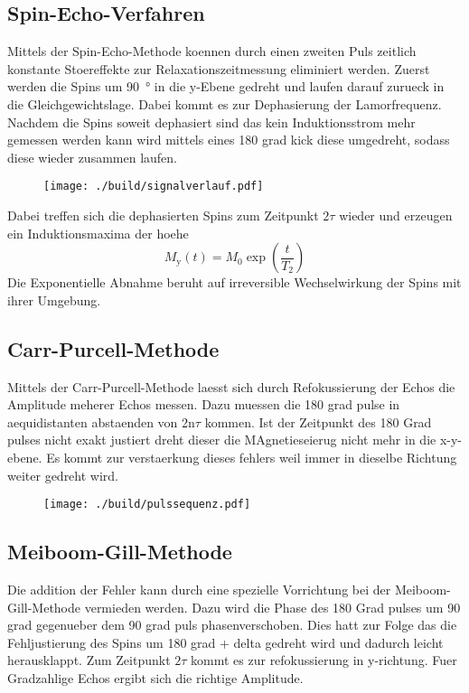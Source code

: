 \subsection{Spin-Echo-Verfahren}%
\label{sub:spin_echo_verfahren}
Mittels der Spin-Echo-Methode koennen durch einen zweiten Puls zeitlich
konstante Stoereffekte zur Relaxationszeitmessung eliminiert werden. 
Zuerst werden die Spins um \SI{90}{\degree} in die y-Ebene gedreht und laufen
darauf zurueck in die Gleichgewichtslage.
Dabei kommt es zur Dephasierung der Lamorfrequenz. 
Nachdem die Spins soweit dephasiert sind das kein Induktionsstrom mehr gemessen
werden kann wird mittels eines 180 grad kick diese umgedreht, sodass diese
wieder zusammen laufen.
\begin{figure}[h]
		\centering
		\texttt{[image: ./build/signalverlauf.pdf]}
		\caption{}
		\label{fig:sign}
\end{figure}
Dabei treffen sich die dephasierten Spins zum Zeitpunkt $2 \tau$ wieder und
erzeugen ein Induktionsmaxima der hoehe 
\begin{equation}
		\label{eq:}
		M_\text{y}(t) = M_0 \exp\left( \frac{t}{T_2} \right)
\end{equation}
Die Exponentielle Abnahme beruht auf irreversible Wechselwirkung der Spins mit
ihrer Umgebung. 

\subsection{Carr-Purcell-Methode}%
\label{sub:car_purcell}
Mittels der Carr-Purcell-Methode laesst sich durch Refokussierung der Echos die
Amplitude meherer Echos messen. 
Dazu muessen die 180 grad pulse in aequidistanten abstaenden von 2n$\tau$
kommen. 
Ist der Zeitpunkt des 180 Grad pulses nicht exakt justiert dreht dieser die
MAgnetieseierug nicht mehr in die x-y-ebene. 
Es kommt zur verstaerkung dieses fehlers weil immer in dieselbe Richtung weiter
gedreht wird.

\begin{figure}[ht]
		\centering
		\texttt{[image: ./build/pulssequenz.pdf]}
		\caption{}
		\label{fig:}
\end{figure}

\subsection{Meiboom-Gill-Methode}%
\label{sub:meiboom_gill_methode}
Die addition der Fehler kann durch eine spezielle Vorrichtung bei der
Meiboom-Gill-Methode vermieden werden.
Dazu wird die Phase des 180 Grad pulses um 90 grad gegenueber dem 90 grad puls phasenverschoben.
Dies hatt zur Folge das die Fehljustierung des Spins um 180 grad + delta gedreht
wird und dadurch leicht herausklappt. 
Zum Zeitpunkt $2 \tau$ kommt es zur refokussierung in y-richtung.
Fuer Gradzahlige Echos ergibt sich die richtige Amplitude.

